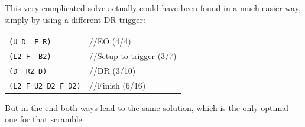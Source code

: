 \documentclass[11pt,a4paper]{book}
\newcommand{\p}{\textquotesingle}
\newcommand{\m}{\texttt}
\newcommand{\ps}{\p\,\,}
\newcommand{\comment}[1]{{\color{gray}\quad//#1}}
\begin{document}
This very complicated solve actually could have been found in a much easier way, simply by using a different DR trigger:

\begin{center}
\begin{tabular}{ll}
\m{(U D\ps F R)} & \comment{EO (4/4)}\\
\m{(L2 F\ps B2)} & \comment{Setup to trigger (3/7)}\\
\m{(D\ps R2 D\p)} & \comment{DR (3/10)}\\
\m{(L2 F U2 D2 F D2)} & \comment{Finish (6/16)}\\
\end{tabular}
\end{center}


But in the end both ways lead to the same solution, which is the only optimal one for that scramble.
\end{document}
